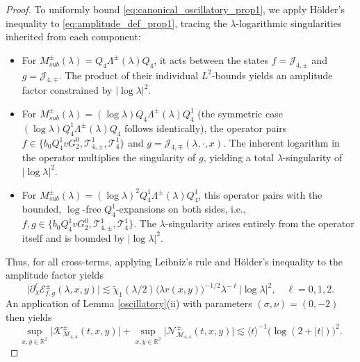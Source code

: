 \documentclass[10pt,a4paper]{amsart}
\begin{document}
\begin{proof}
	To uniformly bound \eqref{eq:canonical_oscillatory_prop1}, we apply H\"older's inequality to \eqref{eq:amplitude_def_prop1}, tracing the $\lambda$-logarithmic singularities inherited from each component:
	\begin{itemize}
		\item For $M_{sub}^\pm(\lambda) = Q_{4} \Lambda^\pm(\lambda) Q_{4}$, it acts between the states $f = \mathcal{J}_{4,\pm}$ and $g = \mathcal{J}_{4,\mp}$. The product of their individual $L^2$-bounds yields an amplitude factor constrained by $ |\log\lambda|^2$.
		\vskip0.2cm
		\item For $M_{sub}^\pm(\lambda) = (\log\lambda) Q_{4} \Lambda^\pm(\lambda) Q_{4}^1$ (the symmetric case $(\log\lambda) Q_{4}^1 \Lambda^\pm(\lambda)Q_{4}$ follows identically),
		the operator pairs $f\in\{b_0 Q_{4}^1 v G_2^0, \mathcal{T}_{4,\pm}^{1}, \mathcal{T}_{4}^{1}\}$ and $g = \mathcal{J}_{4,\mp}(\lambda, \cdot, x)$. The inherent logarithm in the operator multiplies the singularity of $g$, yielding a total $\lambda$-singularity of $ |\log\lambda|^2$.
		\vskip0.2cm
		\item For $M_{sub}^\pm(\lambda) = (\log\lambda)^2 Q_{4}^1 \Lambda^\pm(\lambda) Q_{4}^1$, this operator pairs with the bounded, $\log$-free $Q_{4}^1$-expansions on both sides, i.e., $f,g\in\{b_0 Q_{4}^1 v G_2^0, \mathcal{T}_{4,\pm}^{1}, \mathcal{T}_{4}^{1}\}.$  The $\lambda$-singularity arises entirely from the operator itself and is bounded by $|\log\lambda|^2$.
	\end{itemize}
	Thus, for all cross-terms, applying Leibniz's rule and H\"older's inequality to the amplitude factor yields
	\[
	\bigl| \partial_\lambda^{\ell} \mathcal{E}_{f,g}^\pm(\lambda,x,y) \bigr| \lesssim \widetilde{\chi}_1(\lambda/2) \langle \lambda r(x,y) \rangle^{-1/2} \lambda^{-\ell} |\log\lambda|^2, \quad \ell = 0,1,2.
	\]
	An application of Lemma \ref{oscillatory}(ii) with parameters $(\sigma,\nu)=(0,-2)$ then yields $$
	\sup_{x,y\in \mathbb{R}^2}
	\bigl|
	\mathcal{K}_{\mathcal{M}_{4,4}}^\pm(t,x,y)
	\bigr|
	+
	\sup_{x,y\in \mathbb{R}^2}
	\bigl|
	\mathcal{N}_{\mathcal{M}_{4,4}}^\pm(t,x,y)
	\bigr|
	\lesssim
	\langle t\rangle^{-1}\bigl(\log(2+|t|)\bigr)^2.
	$$
\end{proof}
\end{document}
